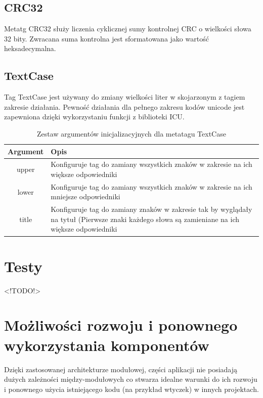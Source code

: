 \subsection{CRC32}
Metatg CRC32 służy liczenia cyklicznej sumy kontrolnej CRC o wielkości słowa 32 bity.
Zwracana suma kontrolna jest sformatowana jako wartość heksadecymalna.

\subsection{TextCase}
Tag TextCase jest używany do zmiany wielkości liter w skojarzonym z tagiem zakresie działania. Pewność działania dla pełnego zakresu kodów unicode jest zapewniona dzięki wykorzystaniu funkcji z biblioteki ICU.



\begin{table}[h]
\begin{center}
\begin{tabular}{| c | p{13cm} |}
\hline
\textbf{Argument} & \textbf{Opis} \\
\hline
upper & Konfiguruje tag do zamiany wszystkich znaków w zakresie na ich większe odpowiedniki \\
lower & Konfiguruje tag do zamiany wszystkich znaków w zakresie na ich mniejsze odpowiedniki \\
title & Konfiguruje tag do zamiany znaków w zakresie tak by wyglądały na tytuł (Pierwsze znaki każdego słowa są zamieniane na ich większe odpowiedniki \\
\hline
\end{tabular} \end{center}
\caption{Zestaw argumentów inicjalizacyjnych dla metatagu TextCase}
\end{table}

\section{Testy}
\label{testy}

<!TODO!>

\section{Możliwości rozwoju i ponownego wykorzystania komponentów}
\par
Dzięki zastosowanej architekturze modułowej, części aplikacji nie posiadają dużych zależności między-modułowych co stwarza idealne warunki do ich rozwoju i ponownego użycia istniejącego kodu (na przykład wtyczek) w innych projektach.

